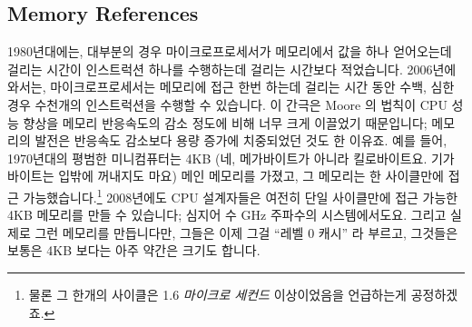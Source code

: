 \subsection{Memory References}
\label{sec:cpu:Memory References}

1980년대에는, 대부분의 경우 마이크로프로세서가 메모리에서 값을 하나 얻어오는데
걸리는 시간이 인스트럭션 하나를 수행하는데 걸리는 시간보다 적었습니다.
2006년에 와서는, 마이크로프로세서는 메모리에 접근 한번 하는데 걸리는 시간 동안
수백, 심한 경우 수천개의 인스트럭션을 수행할 수 있습니다.
이 간극은 Moore 의 법칙이 CPU 성능 향상을 메모리 반응속도의 감소 정도에 비해
너무 크게 이끌었기 때문입니다; 메모리의 발전은 반응속도 감소보다 용량 증가에
치중되었던 것도 한 이유죠.
예를 들어, 1970년대의 평범한 미니컴퓨터는 4KB (네, 메가바이트가 아니라
킬로바이트요. 기가바이트는 입밖에 꺼내지도 마요) 메인 메모리를 가졌고, 그
메모리는 한 사이클만에 접근 가능했습니다.\footnote{
	물론 그 한개의 사이클은 1.6 \emph{마이크로 세컨드} 이상이었음을
	언급하는게 공정하겠죠.}
2008년에도 CPU 설계자들은 여전히 단일 사이클만에 접근 가능한 4KB 메모리를 만들
수 있습니다; 심지어 수 GHz 주파수의 시스템에서도요.
그리고 실제로 그런 메모리를 만듭니다만, 그들은 이제 그걸 ``레벨 0 캐시'' 라
부르고, 그것들은 보통은 4KB 보다는 아주 약간은 크기도 합니다.

